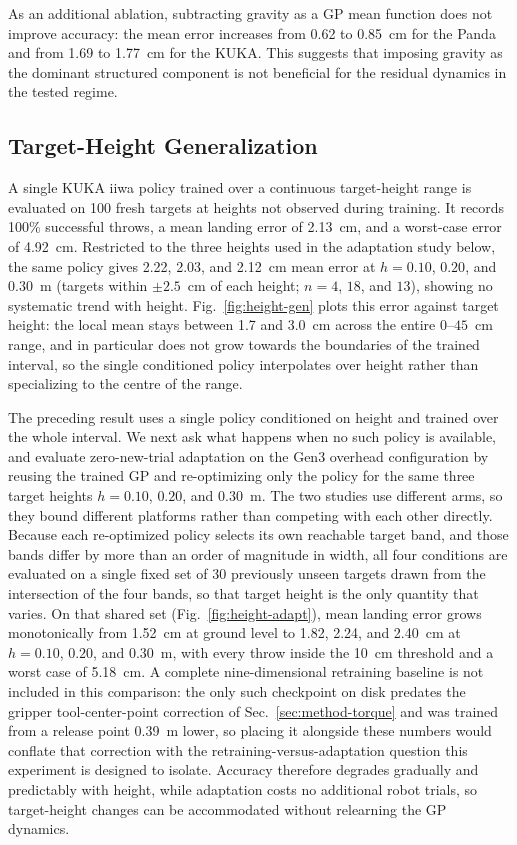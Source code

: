 \documentclass[letterpaper, 10 pt, conference]{ieeeconf}
\begin{document}
As an additional ablation, subtracting gravity as a GP mean function does not
improve accuracy: the mean error increases from 0.62 to 0.85~cm for the Panda
and from 1.69 to 1.77~cm for the KUKA. This suggests that imposing gravity as
the dominant structured component is not beneficial for the residual dynamics
in the tested regime.


\subsection{Target-Height Generalization}
\label{sec:results-height}

A single KUKA iiwa policy trained over a continuous target-height range is
evaluated on 100 fresh targets at heights not observed during training. It
records 100\% successful throws, a mean landing error of 2.13~cm, and a
worst-case error of 4.92~cm. Restricted to the three heights used in the
adaptation study below, the same policy gives 2.22, 2.03, and 2.12~cm mean
error at $h=0.10$, $0.20$, and $0.30$~m (targets within $\pm2.5$~cm of each
height; $n=4$, $18$, and $13$), showing no systematic trend with height.
Fig.~\ref{fig:height-gen} plots this error against
target height: the local mean stays between 1.7 and 3.0~cm across the entire
$0$--$45$~cm range, and in particular does not grow towards the boundaries of
the trained interval, so the single conditioned policy interpolates over height
rather than specializing to the centre of the range.

The preceding result uses a single policy conditioned on height and trained
over the whole interval. We next ask what happens when no such policy is
available, and evaluate zero-new-trial adaptation on the Gen3 overhead
configuration by reusing the trained GP and re-optimizing only the policy for
the same three target heights $h=0.10$, $0.20$, and $0.30$~m. The two studies
use different arms, so they bound different platforms rather than competing
with each other directly. Because each re-optimized policy selects its
own reachable target band, and those bands differ by more than an order of
magnitude in width, all four conditions are evaluated on a single fixed set of
30 previously unseen targets drawn from the intersection of the four bands, so
that target height is the only quantity that varies. On that shared set
(Fig.~\ref{fig:height-adapt}), mean landing error grows monotonically from
1.52~cm at ground level to 1.82, 2.24, and 2.40~cm at $h=0.10$, $0.20$, and
$0.30$~m, with every throw inside the 10~cm threshold and a worst case of
5.18~cm. A complete nine-dimensional retraining baseline is not included in
this comparison: the only such checkpoint on disk predates the gripper
tool-center-point correction of Sec.~\ref{sec:method-torque} and was trained
from a release point 0.39~m lower, so placing it alongside these numbers would
conflate that correction with the retraining-versus-adaptation question this
experiment is designed to isolate. Accuracy therefore degrades gradually and
predictably with height,
while adaptation costs no additional robot trials, so target-height changes can
be accommodated without relearning the GP dynamics.
\end{document}
